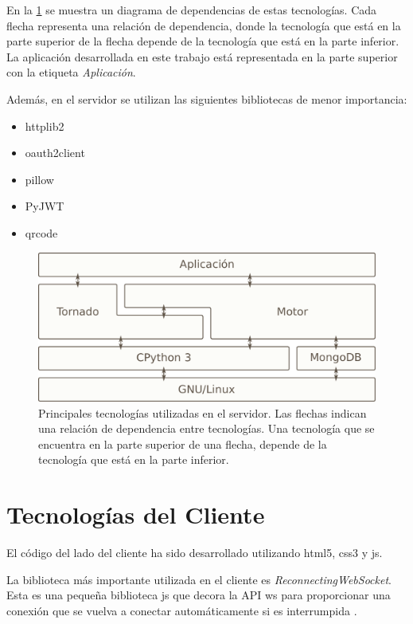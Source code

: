 En la \cref{f_stack} se muestra un diagrama de dependencias de estas
tecnologías. Cada flecha representa una relación de dependencia, donde
la tecnología que está en la parte superior de la flecha depende de la
tecnología que está en la parte inferior. La aplicación desarrollada en
este trabajo está representada en la parte superior con la etiqueta
\emph{Aplicación}.

Además, en el \gls{servidor} se utilizan las siguientes bibliotecas de
menor importancia:

\begin{itemize}
\itemsep1pt\parskip0pt
\item
  httplib2
\item
  oauth2client
\item
  pillow
\item
  PyJWT
\item
  qrcode
\end{itemize}

\begin{figure}[htbp]
\centering
\includegraphics{src/anexos/fig/stack.pdf}
\caption{Principales tecnologías utilizadas en el \gls{servidor}. Las
flechas indican una relación de dependencia entre tecnologías. Una
tecnología que se encuentra en la parte superior de una flecha, depende
de la tecnología que está en la parte inferior. \label{f_stack}}
\end{figure}

\section{Tecnologías del Cliente}\label{tecnologuxedas-del-cliente}

El código del lado del \gls{cliente} ha sido desarrollado utilizando
\gls{html5}, \gls{css3} y \gls{js}.

La biblioteca más importante utilizada en el \gls{cliente} es
\emph{ReconnectingWebSocket}. Esta es una pequeña biblioteca \gls{js}
que decora la API \gls{ws} para proporcionar una conexión que se vuelva
a conectar automáticamente si es interrumpida \cite{rws}.

